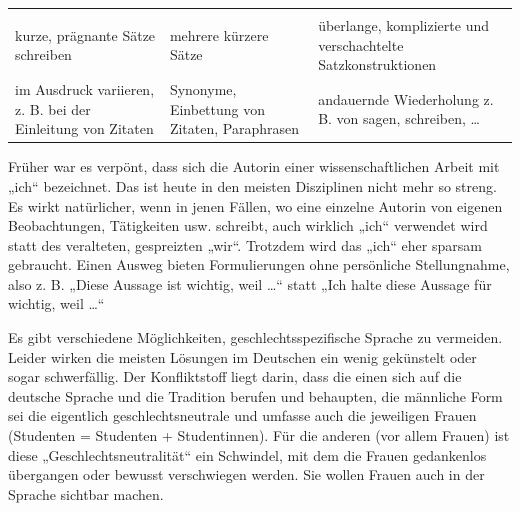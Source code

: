 \documentclass[]{book}
\theoremstyle{definition}
\theoremstyle{definition}
\theoremstyle{definition}
\theoremstyle{remark}
\begin{document}
\begin{longtable}[]{@{}lll@{}}
\begin{minipage}[t]{0.39\columnwidth}
\end{minipage}\tabularnewline
\begin{minipage}[t]{0.11\columnwidth}\raggedright\strut
kurze, prägnante Sätze schreiben\strut
\end{minipage} & \begin{minipage}[t]{0.42\columnwidth}\raggedright\strut
mehrere kürzere Sätze\strut
\end{minipage} & \begin{minipage}[t]{0.39\columnwidth}\raggedright\strut
überlange, komplizierte und verschachtelte Satzkonstruktionen
\vspace{-6mm}\strut
\end{minipage}\tabularnewline
\begin{minipage}[t]{0.11\columnwidth}\raggedright\strut
im Ausdruck variieren, z. B. bei der Einleitung von Zitaten\strut
\end{minipage} & \begin{minipage}[t]{0.42\columnwidth}\raggedright\strut
Synonyme, Einbettung von Zitaten, Paraphrasen\strut
\end{minipage} & \begin{minipage}[t]{0.39\columnwidth}\raggedright\strut
andauernde Wiederholung z. B. von sagen, schreiben, \ldots{}\strut
\end{minipage}\tabularnewline
\bottomrule
\end{longtable}

Früher war es verpönt, dass sich die Autorin einer wissenschaftlichen
Arbeit mit „ich`` bezeichnet. Das ist heute in den meisten Disziplinen
nicht mehr so streng. Es wirkt natürlicher, wenn in jenen Fällen, wo
eine einzelne Autorin von eigenen Beobachtungen, Tätigkeiten usw.
schreibt, auch wirklich „ich`` verwendet wird statt des veralteten,
gespreizten „wir``. Trotzdem wird das „ich`` eher sparsam gebraucht.
Einen Ausweg bieten Formulierungen ohne persönliche Stellungnahme, also
z. B. „Diese Aussage ist wichtig, weil \ldots{}`` statt „Ich halte diese
Aussage für wichtig, weil \ldots{}``

Es gibt verschiedene Möglichkeiten, geschlechtsspezifische Sprache zu
vermeiden. Leider wirken die meisten Lösungen im Deutschen ein wenig
gekünstelt oder sogar schwerfällig. Der Konfliktstoff liegt darin, dass
die einen sich auf die deutsche Sprache und die Tradition berufen und
behaupten, die männliche Form sei die eigentlich geschlechtsneutrale und
umfasse auch die jeweiligen Frauen (Studenten = Studenten +
Studentinnen). Für die anderen (vor allem Frauen) ist diese
„Geschlechtsneutralität`` ein Schwindel, mit dem die Frauen gedankenlos
übergangen oder bewusst verschwiegen werden. Sie wollen Frauen auch in
der Sprache sichtbar machen.
\end{document}
